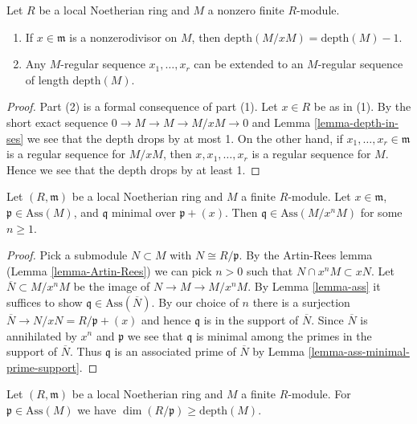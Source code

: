 \begin{lemma}
\label{lemma-depth-drops-by-one}
Let $R$ be a local Noetherian ring and $M$ a nonzero finite $R$-module.
\begin{enumerate}
\item If $x \in \mathfrak m$ is a nonzerodivisor on $M$, then
$\text{depth}(M/xM) = \text{depth}(M) - 1$.
\item Any $M$-regular sequence $x_1, \ldots, x_r$ can be extended to an
$M$-regular sequence of length $\text{depth}(M)$.
\end{enumerate}
\end{lemma}

\begin{proof}
Part (2) is a formal consequence of part (1). Let $x \in R$ be as in (1).
By the short exact sequence $0 \to M \to M \to M/xM \to 0$
and Lemma \ref{lemma-depth-in-ses} we see that the depth drops by at most 1.
On the other hand, if $x_1, \ldots, x_r \in \mathfrak m$
is a regular sequence for $M/xM$, then $x, x_1, \ldots, x_r$
is a regular sequence for $M$. Hence we see that the depth drops by
at least 1.
\end{proof}

\begin{lemma}
\label{lemma-inherit-minimal-primes}
Let $(R, \mathfrak m)$ be a local Noetherian ring and $M$ a finite $R$-module.
Let $x \in \mathfrak m$, $\mathfrak p \in \text{Ass}(M)$, and $\mathfrak q$
minimal over $\mathfrak p + (x)$. Then $\mathfrak q \in \text{Ass}(M/x^nM)$
for some $n \geq 1$.
\end{lemma}

\begin{proof}
Pick a submodule $N \subset M$ with $N \cong R/\mathfrak p$.
By the Artin-Rees lemma (Lemma \ref{lemma-Artin-Rees})
we can pick $n > 0$ such that $N \cap x^nM \subset xN$.
Let $\overline{N} \subset M/x^nM$ be the image of $N \to M \to M/x^nM$.
By Lemma \ref{lemma-ass} it suffices to show
$\mathfrak q \in \text{Ass}(\overline{N})$.
By our choice of $n$ there is a surjection
$\overline{N} \to N/xN = R/\mathfrak p + (x)$
and hence $\mathfrak q$ is in the support of $\overline{N}$.
Since $\overline{N}$ is annihilated by $x^n$ and $\mathfrak p$ we see that
$\mathfrak q$ is minimal among the primes in the support of $\overline{N}$.
Thus $\mathfrak q$ is an associated prime of $\overline{N}$ by
Lemma \ref{lemma-ass-minimal-prime-support}.
\end{proof}

\begin{lemma}
\label{lemma-depth-dim-associated-primes}
Let $(R, \mathfrak m)$ be a local Noetherian ring and $M$ a finite $R$-module.
For $\mathfrak p \in \text{Ass}(M)$ we have
$\dim(R/\mathfrak p) \geq \text{depth}(M)$.
\end{lemma}


